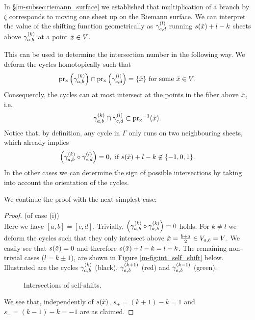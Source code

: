 \documentclass[main.tex]{subfiles}
\begin{document}
  In \S \ref{m-subsec:riemann_surface} we established that multiplication of a branch by $\zeta$ corresponds to moving
  one sheet up on the Riemann surface.
  We can interpret the value of the shifting function geometrically as
  $\gamma_{c,d}^{(l)}$ running $s(\tilde{x})+l-k$ sheets above $\gamma_{a,b}^{(k)}$ at a point $\tilde{x} \in V$.

 This can be used to determine the intersection number in the following way. We deform the cycles homotopically
 such that
 \begin{equation*}
   \operatorname{pr_x}\left(\gamma_{a,b}^{(k)}\right) \cap \operatorname{pr_x}\left(\gamma_{c,d}^{(l)}\right) = \{ \tilde{x} \}  \text{ for some $\tilde{x} \in V$.}
 \end{equation*}
 Consequently, the cycles can at most intersect at the
 points in the fiber above $\tilde{x}$, i.e.
 \begin{equation*}
  \gamma_{a,b}^{(k)} \cap \gamma_{c,d}^{(l)} \subset \operatorname{pr_x}^{-1}(\tilde{x}).
 \end{equation*}
 Notice that, by definition, any cycle in $\Gamma$ only runs on two neighbouring sheets, which already implies
 \begin{equation*}
   \left(\gamma_{a,b}^{(k)} \circ \gamma_{c,d}^{(l)}\right) = 0, \text{ if $s(\tilde{x})+l-k \not\in \{-1,0,1\}$.}
 \end{equation*}
  In the other cases we can determine the
  sign of possible intersections by taking into account the orientation of the cycles.

 We continue the proof with the next simplest case:
 \begin{proof}\let\qed\relax (of case (i)) \\
 Here we have $[a,b] = [c,d]$. Trivially, $\left( \gamma_{a,b}^{(k)} \circ \gamma_{a,b}^{(k)} \right) = 0$ holds. For $k \ne l$ we deform the cycles such that they only intersect above
 $\tilde{x} = \frac{b+a}{2} \in  V_{a,b}= V$.
  We easily see that $s(\tilde{x}) = 0$ and therefore $s(\tilde{x}) + l - k = l - k$. The remaining non-trivial cases
 ($l = k \pm 1$), are shown in Figure \ref{m-fig:int_self_shift} below.
   Illustrated are the cycles $\gamma_{a,b}^{(k)}$ (black),
      $\gamma_{a,b}^{(k+1)}$ (red) and $\gamma_{a,b}^{(k-1)}$ (green).
    \begin{figure}[H]
      \begin{center}
   \scalebox{0.8}{}
      \end{center}
    \caption{Intersections of self-shifts.}
    \label{fig:int_self_shift}
\end{figure}
  We see that, independently of $s(\tilde{x})$, $s_+ = (k+1)-k = 1$ and $s_- = (k-1)-k = -1$ are as claimed.
 \end{proof}
\end{document}
